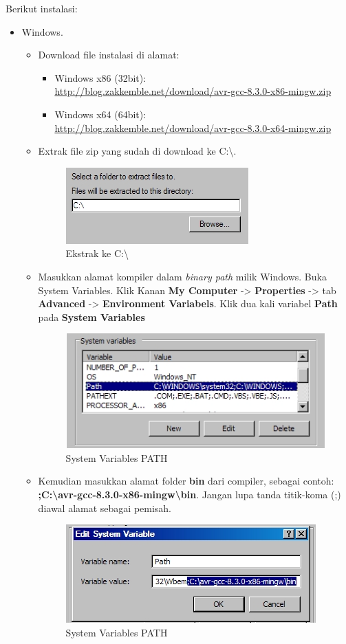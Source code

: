 \documentclass[12pt,]{article}
\begin{document}
	Berikut instalasi:
	\begin{itemize}
		\item Windows.
		\begin{itemize}
			\item Download file instalasi di alamat:
			\begin{itemize}
				\item Windows x86 (32bit):\\
				\url{http://blog.zakkemble.net/download/avr-gcc-8.3.0-x86-mingw.zip}
				\item Windows x64 (64bit):\\
				\url{http://blog.zakkemble.net/download/avr-gcc-8.3.0-x64-mingw.zip}
			\end{itemize}
		
			\item Extrak file zip yang sudah di download ke C:\textbackslash.
			\begin{figure}[H]
				\centering
				\includegraphics[width=0.35\linewidth]{images/avrgcc_0a}
				\caption{Ekstrak ke C:\textbackslash}
			\end{figure}
			
			\item Masukkan alamat kompiler dalam \textit{binary path} milik Windows.
			Buka System Variables. Klik Kanan \textbf{My Computer} -> \textbf{Properties} -> tab \textbf{Advanced} -> \textbf{Environment Variabels}.
			Klik dua kali variabel \textbf{Path} pada \textbf{System Variables}

			\begin{figure}[H]
				\centering
				\includegraphics[width=0.35\linewidth]{images/avrgcc_0b}
				\caption{System Variables PATH}
			\end{figure}
			
			\item Kemudian masukkan alamat folder \textbf{bin} dari compiler, sebagai contoh:\\
			\textbf{;C:\textbackslash avr-gcc-8.3.0-x86-mingw\textbackslash bin}.
			Jangan lupa tanda titik-koma (;) diawal alamat sebagai pemisah.
			\begin{figure}[H]
				\centering
				\includegraphics[width=0.35\linewidth]{images/avrgcc_0c}
				\caption{System Variables PATH}
			\end{figure}
		

\end{itemize}
\end{itemize}
\end{document}

